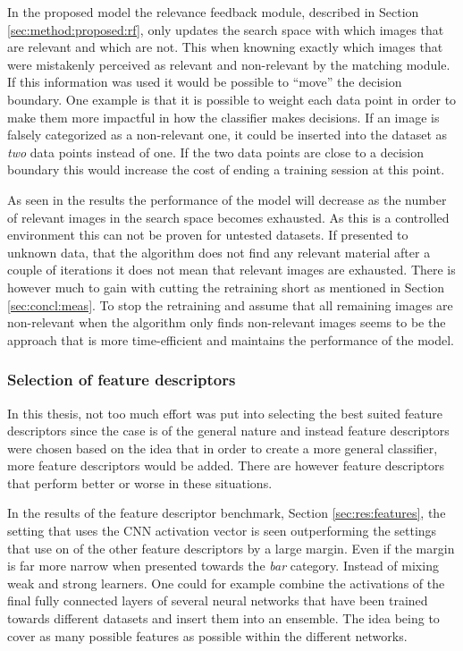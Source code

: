 In the proposed model the relevance feedback module, described in Section \ref{sec:method:proposed:rf}, only updates the search space with which images that are relevant and which are not. This when knowning exactly which images that were mistakenly perceived as relevant and non-relevant by the matching module. If this information was used it would be possible to ``move'' the decision boundary. 
One example is that it is possible to weight each data point in order to make them more impactful in how the classifier makes decisions. If an image is falsely categorized as a non-relevant one, it could be inserted into the dataset as \emph{two} data points instead of one. If the two data points are close to a decision boundary this would increase the cost of ending a training session at this point. 

As seen in the results the performance of the model will decrease as the number of relevant images in the search space becomes exhausted. As this is a controlled environment this can not be proven for untested datasets. If presented to unknown data, that the algorithm does not find any relevant material after a couple of iterations it does not mean that relevant images are exhausted. There is however much to gain with cutting the retraining short as mentioned in Section \ref{sec:concl:meas}. To stop the retraining and assume that all remaining images are non-relevant when the algorithm only finds non-relevant images seems to be the approach that is more time-efficient and maintains the performance of the model.

\subsubsection{Selection of feature descriptors}
\label{sec:conc:future:model:feat}
In this thesis, not too much effort was put into selecting the best suited feature descriptors since the case is of the general nature and instead feature descriptors were chosen based on the idea that in order to create a more general classifier, more feature descriptors would be added. There are however feature descriptors that perform better or worse in these situations.

In the results of the feature descriptor benchmark, Section \ref{sec:res:features}, the setting that uses the CNN activation vector is seen outperforming the settings that use on of the other feature descriptors by a large margin. Even if the margin is far more narrow when presented towards the \emph{bar} category. Instead of mixing weak and strong learners. One could for example combine the activations of the final fully connected layers of several neural networks that have been trained towards different datasets and insert them into an ensemble. The idea being to cover as many possible features as possible within the different networks. 

